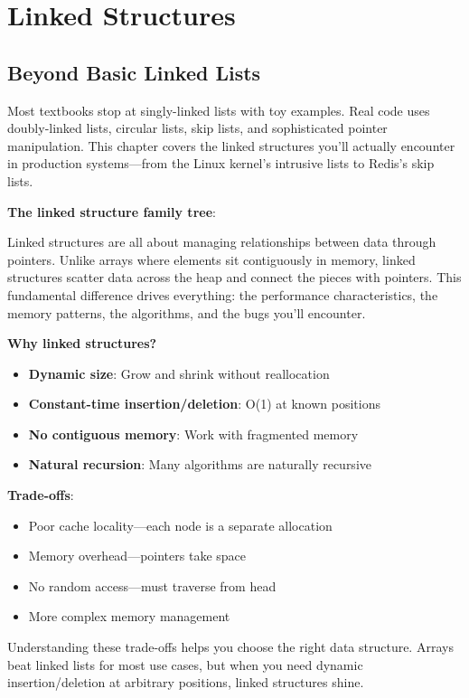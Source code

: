 \chapter{Linked Structures}

\section{Beyond Basic Linked Lists}

Most textbooks stop at singly-linked lists with toy examples. Real code uses doubly-linked lists, circular lists, skip lists, and sophisticated pointer manipulation. This chapter covers the linked structures you'll actually encounter in production systems—from the Linux kernel's intrusive lists to Redis's skip lists.

\textbf{The linked structure family tree}:

Linked structures are all about managing relationships between data through pointers. Unlike arrays where elements sit contiguously in memory, linked structures scatter data across the heap and connect the pieces with pointers. This fundamental difference drives everything: the performance characteristics, the memory patterns, the algorithms, and the bugs you'll encounter.

\textbf{Why linked structures?}

\begin{itemize}
    \item \textbf{Dynamic size}: Grow and shrink without reallocation
    \item \textbf{Constant-time insertion/deletion}: O(1) at known positions
    \item \textbf{No contiguous memory}: Work with fragmented memory
    \item \textbf{Natural recursion}: Many algorithms are naturally recursive
\end{itemize}

\textbf{Trade-offs}:

\begin{itemize}
    \item Poor cache locality—each node is a separate allocation
    \item Memory overhead—pointers take space
    \item No random access—must traverse from head
    \item More complex memory management
\end{itemize}

Understanding these trade-offs helps you choose the right data structure. Arrays beat linked lists for most use cases, but when you need dynamic insertion/deletion at arbitrary positions, linked structures shine.

